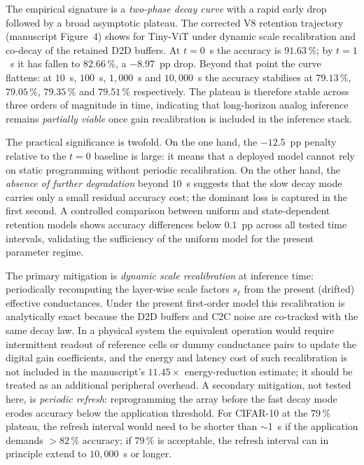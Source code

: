 The empirical signature is a \emph{two-phase decay curve} with a rapid early drop followed by a broad asymptotic plateau.  The corrected V8 retention trajectory (manuscript Figure~4) shows for Tiny-ViT under dynamic scale recalibration and co-decay of the retained D2D buffers.  At $t=0$~s the accuracy is $91.63\,\%$; by $t=1$~s it has fallen to $82.66\,\%$, a $-8.97$~pp drop.  Beyond that point the curve flattens: at $10$~s, $100$~s, $1{,}000$~s and $10{,}000$~s the accuracy stabilises at $79.13\,\%$, $79.05\,\%$, $79.35\,\%$ and $79.51\,\%$ respectively.  The plateau is therefore stable across three orders of magnitude in time, indicating that long-horizon analog inference remains \emph{partially viable} once gain recalibration is included in the inference stack.

The practical significance is twofold.  On the one hand, the $-12.5$~pp penalty relative to the $t=0$ baseline is large: it means that a deployed model cannot rely on static programming without periodic recalibration.  On the other hand, the \emph{absence of further degradation} beyond $10$~s suggests that the slow decay mode carries only a small residual accuracy cost; the dominant loss is captured in the first second.  A controlled comparison between uniform and state-dependent retention models shows accuracy differences below $0.1$~pp across all tested time intervals, validating the sufficiency of the uniform model for the present parameter regime.

The primary mitigation is \emph{dynamic scale recalibration} at inference time: periodically recomputing the layer-wise scale factors $s_{\ell}$ from the present (drifted) effective conductances.  Under the present first-order model this recalibration is analytically exact because the D2D buffers and C2C noise are co-tracked with the same decay law.  In a physical system the equivalent operation would require intermittent readout of reference cells or dummy conductance pairs to update the digital gain coefficients, and the energy and latency cost of such recalibration is not included in the manuscript's $11.45\times$ energy-reduction estimate; it should be treated as an additional peripheral overhead.  A secondary mitigation, not tested here, is \emph{periodic refresh}: reprogramming the array before the fast decay mode erodes accuracy below the application threshold.  For CIFAR-10 at the $79\,\%$ plateau, the refresh interval would need to be shorter than $\sim$1~s if the application demands $>82\,\%$ accuracy; if $79\,\%$ is acceptable, the refresh interval can in principle extend to $10{,}000$~s or longer.

